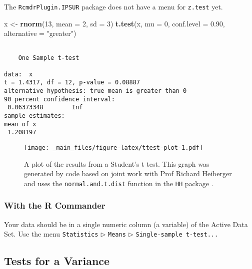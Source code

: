 \documentclass[]{book}
\newenvironment{Shaded}{\begin{snugshade}}{\end{snugshade}}
\newcommand{\KeywordTok}[1]{\textcolor[rgb]{0.13,0.29,0.53}{\textbf{{#1}}}}
\newcommand{\DataTypeTok}[1]{\textcolor[rgb]{0.13,0.29,0.53}{{#1}}}
\newcommand{\DecValTok}[1]{\textcolor[rgb]{0.00,0.00,0.81}{{#1}}}
\newcommand{\FloatTok}[1]{\textcolor[rgb]{0.00,0.00,0.81}{{#1}}}
\newcommand{\StringTok}[1]{\textcolor[rgb]{0.31,0.60,0.02}{{#1}}}
\newcommand{\NormalTok}[1]{{#1}}
\numberwithin{equation}{chapter}
\numberwithin{figure}{chapter}
\theoremstyle{plain}
\theoremstyle{definition}
\theoremstyle{remark}
\theoremstyle{definition}
\theoremstyle{definition}
\theoremstyle{remark}
\begin{document}
The \texttt{RcmdrPlugin.IPSUR} package \autocite{RcmdrPlugin.IPSUR} does
not have a menu for \texttt{z.test} yet.

\begin{Shaded}
\begin{Highlighting}[]
\NormalTok{x <-}\StringTok{ }\KeywordTok{rnorm}\NormalTok{(}\DecValTok{13}\NormalTok{, }\DataTypeTok{mean =} \DecValTok{2}\NormalTok{, }\DataTypeTok{sd =} \DecValTok{3}\NormalTok{)}
\KeywordTok{t.test}\NormalTok{(x, }\DataTypeTok{mu =} \DecValTok{0}\NormalTok{, }\DataTypeTok{conf.level =} \FloatTok{0.90}\NormalTok{, }\DataTypeTok{alternative =} \StringTok{"greater"}\NormalTok{)}
\end{Highlighting}
\end{Shaded}

\begin{verbatim}

    One Sample t-test

data:  x
t = 1.4317, df = 12, p-value = 0.08887
alternative hypothesis: true mean is greater than 0
90 percent confidence interval:
 0.06373348        Inf
sample estimates:
mean of x 
 1.208197 
\end{verbatim}

\begin{figure}[htbp]
\centering
\texttt{[image: \_main\_files/figure-latex/ttest-plot-1.pdf]}
\caption{\label{fig:ttest-plot}\small A plot of the results from a Student's t
test. This graph was generated by code based on joint work with Prof
Richard Heiberger and uses the \texttt{normal.and.t.dist} function in
the \texttt{HH} package \autocite{HH}.}
\end{figure}






\subsubsection{With the R Commander}\label{with-the-r-commander-1}

Your data should be in a single numeric column (a variable) of the
Active Data Set. Use the menu \texttt{Statistics} \(\triangleright\)
\texttt{Means} \(\triangleright\) \texttt{Single-sample\ t-test...}

\subsection{Tests for a Variance}\label{tests-for-a-variance}
\end{document}
